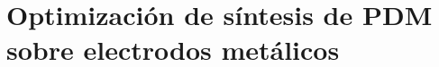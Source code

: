  \newcommand{\NoBiblioMeso}[1]{
 \ifthenelse{\equal{#1}{verdadero}}{}{}
 \NoBiblioMeso{verdadero}}

 
 \FormatoCapituloDosLineas
 
\chapter{Optimización de síntesis de PDM sobre electrodos metálicos}
 \label{chap:Mesoporosos}

 \thispagestyle{empty}
	
 
 \vfill
 \minitoc
 \newpage


